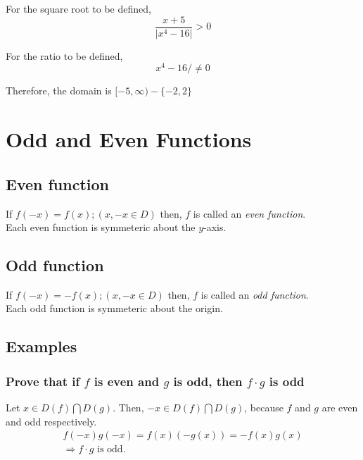 \documentclass[fleqn]{article}
\begin{document}
For the square root to be defined, 
\begin{equation*}
	\dfrac{x+5}{\lvert	x^4 - 16	\rvert} > 0
\end{equation*}

For the ratio to be defined, 
\begin{equation*}
	x^4 - 16 /\neq 0
\end{equation*}

Therefore, the domain is $[-5, \infty) - \{-2, 2\}$

\newpage
\section{Odd and Even Functions}

\subsection{Even function}

If $f(-x) = f(x) ; (x, -x \in D)$ then, $f$ is called an \emph{even function}. \\
Each even function is symmeteric about the $y$-axis. \\

\subsection{Odd function}

If $f(-x) = -f(x) ; (x, -x \in D)$ then, $f$ is called an \emph{odd function}. \\
Each odd function is symmeteric about the origin. \\

\subsection{Examples}

\subsubsection{Prove that if $f$ is even and $g$ is odd, then $f \cdot g$ is odd}

Let $x \in D(f) \bigcap D(g)$. Then, $-x \in D(f) \bigcap D(g)$, because $f$ and $g$ are even and odd respectively.\\
\begin{align*}
	f(-x) g(-x) = f(x) (-g(x)) = -f(x) g(x)\\
	\Rightarrow f \cdot g \text{ is odd.}
\end{align*}
\end{document}

